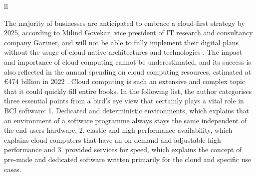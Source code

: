 \begin{table}[!ht]
{\begin{tabular}{ll}
       \\ \hline
    \end{tabular}%
  }
  \vspace{10pt}
  \caption{The three abstraction levels and types of cloud computing \citep{amazon_web_services_inc_what_nodate}.}
  \label{tab:cloud-computing-types}
\end{table}
\raggedbottom

The majority of businesses are anticipated to embrace a cloud-first strategy by 2025, according to Milind Govekar, vice president of IT research and consultancy company Gartner, and will not be able to fully implement their digital plans without the usage of cloud-native architectures and technologies \citep{gartner_gartner_nodate}. The impact and importance of cloud computing cannot be underestimated, and its success is also reflected in the annual spending on cloud computing resources, estimated at €474 billion in 2022 \citep{gartner_gartner_nodate}. Cloud computing is such an extensive and complex topic that it could quickly fill entire books. In the following list, the author categorises three essential points from a bird's eye view that certainly plays a vital role in BCI software: 1. Dedicated and deterministic environments, which explains that an environment of a software programme always stays the same independent of the end-users hardware, 2. elastic and high-performance availability, which explains cloud computers that have an on-demand and adjustable high-performance and 3. provided services for speed, which explains the concept of pre-made and dedicated software written primarily for the cloud and specific use cases.

